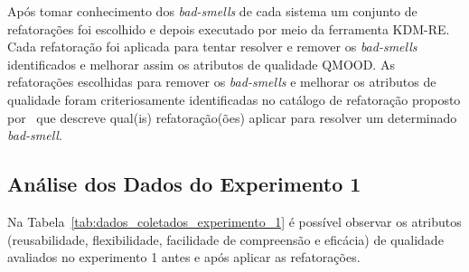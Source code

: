 Após tomar conhecimento dos \textit{bad-smells} de cada sistema um conjunto de refatorações foi escolhido e depois executado por meio da ferramenta KDM-RE. Cada refatoração foi aplicada para tentar resolver e remover os \textit{bad-smells} identificados e melhorar assim os atributos de qualidade QMOOD. As refatorações escolhidas para remover os \textit{bad-smells} e melhorar os atributos de qualidade foram criteriosamente identificadas no catálogo de refatoração proposto por~ que descreve qual(is) refatoração(ões) aplicar para resolver um determinado \textit{bad-smell}. 


\subsection{Análise dos Dados do Experimento 1}

Na Tabela~\ref{tab:dados_coletados_experimento_1} é possível observar os atributos (reusabilidade, flexibilidade, facilidade de compreensão e eficácia) de qualidade avaliados no experimento 1 antes e após aplicar as refatorações.


